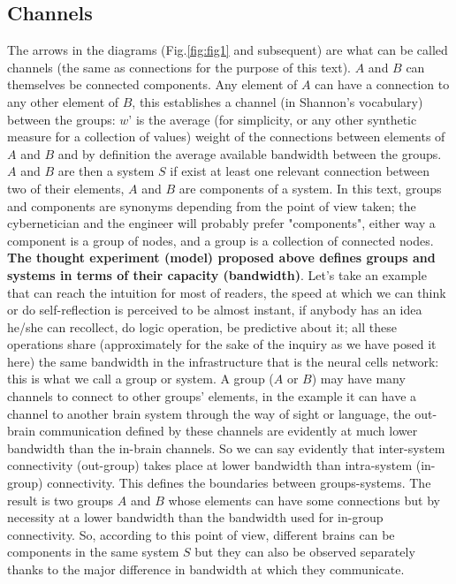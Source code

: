 \documentclass[14pt]{extarticle}
\begin{document}
\subsection*{Channels}
\label{subsec:channels}
\hspace*{15mm}The arrows in the diagrams (Fig.\ref{fig:fig1} and subsequent) are what can be called channels (the same as connections for the purpose of this text).
\newline
\hspace*{15mm}\(A\) and \(B\) can themselves be connected components. Any element of \(A\) can have a connection to any other element of \(B\), this establishes a channel (in Shannon’s vocabulary) between the groups: \(w’\) is the average (for simplicity, or any other synthetic measure for a collection of values) weight of the connections between elements of \(A\) and \(B\) and by definition the average available bandwidth between the groups.
\newline
\hspace*{15mm}\(A\) and \(B\) are then a system \(S\) if exist at least one relevant connection between two of their elements, \(A\) and \(B\) are components of a system.
\newline 
\hspace*{15mm}In this text, groups and components are synonyms depending from the point of view taken; the cybernetician and the engineer will probably prefer "components", either way a component is a group of nodes, and a group is a collection of connected nodes.
\textbf{The thought experiment (model) proposed above defines groups and systems in terms of their capacity (bandwidth)}.
\newline
\hspace*{15mm}Let's take an example that can reach the intuition for most of readers, the speed at which we can think or do self-reflection is perceived to be almost instant, if anybody has an idea he/she can recollect, do logic operation, be predictive about it; all these operations share (approximately for the sake of the inquiry as we have posed it here) the same bandwidth in the infrastructure that is the neural cells network: this is what we call a group or system.
A group (\(A\) or \(B\)) may have many channels to connect to other groups' elements, in the example it can have a channel to another brain system through the way of sight or language, the out-brain communication defined by these channels are evidently at much lower bandwidth than the in-brain channels. So we can say evidently that inter-system connectivity (out-group) takes place at lower bandwidth than intra-system (in-group) connectivity.
This defines the boundaries between groups-systems. The result is two groups \(A\) and \(B\) whose elements can have some connections but by necessity at a lower bandwidth than the bandwidth used for in-group connectivity. So, according to this point of view, different brains can be components in the same system \(S\) but they can also be observed separately thanks to the major difference in bandwidth at which they communicate.
\end{document}
